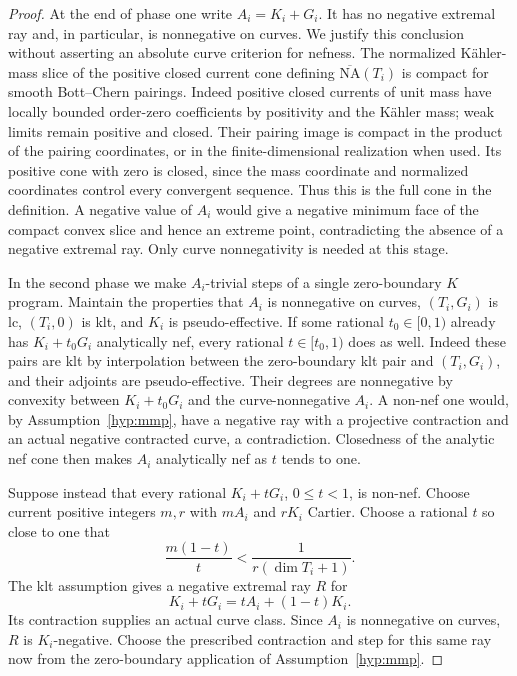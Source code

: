\documentclass[11pt,letterpaper]{article}
\theoremstyle{definition}
\theoremstyle{remark}
\begin{document}
\begin{proof}
At the end of phase one write $A_i=K_i+G_i$.  It has no negative
extremal ray and, in particular, is nonnegative on curves.  We
justify this conclusion without asserting an absolute curve
criterion for nefness.  The normalized K\"ahler-mass slice of the
positive closed current cone defining
$\overline{\mathrm{NA}}(T_i)$ is compact for smooth Bott--Chern pairings.
Indeed positive closed currents of unit mass have locally bounded
order-zero coefficients by positivity and the K\"ahler mass; weak
limits remain positive and closed.  Their pairing image is compact
in the product of the pairing coordinates, or in the
finite-dimensional realization when used.  Its positive cone with
zero is closed, since the mass coordinate and normalized
coordinates control every convergent sequence.  Thus this is the
full cone in the definition.  A negative value of $A_i$ would give
a negative minimum face of the compact convex slice and hence an
extreme point, contradicting the absence of a negative extremal
ray.  Only curve nonnegativity is needed at this stage.

In the second phase we make $A_i$-trivial steps of a single
zero-boundary $K$ program.  Maintain the properties that $A_i$ is
nonnegative on curves, $(T_i,G_i)$ is lc, $(T_i,0)$ is klt, and
$K_i$ is pseudo-effective.  If some rational $t_0\in[0,1)$ already
has $K_i+t_0G_i$ analytically nef, every rational $t\in[t_0,1)$
does as well.  Indeed these pairs are klt by interpolation between
the zero-boundary klt pair and $(T_i,G_i)$, and their adjoints are
pseudo-effective.  Their degrees are nonnegative by convexity
between $K_i+t_0G_i$ and the curve-nonnegative $A_i$.  A non-nef
one would, by Assumption~\ref{hyp:mmp}, have a negative ray with a
projective contraction and an actual negative contracted curve, a
contradiction.  Closedness of the analytic nef cone then makes
$A_i$ analytically nef as $t$ tends to one.

Suppose instead that every rational $K_i+tG_i$, $0\leq t<1$, is
non-nef.  Choose current positive integers $m,r$ with $mA_i$ and
$rK_i$ Cartier.  Choose a rational $t$ so close to one that
\begin{equation}
 \frac{m(1-t)}{t}<\frac{1}{r(\dim T_i+1)}.
 \label{bir:near-one-choice}
\end{equation}
The klt assumption gives a negative extremal ray $R$ for
\[
 K_i+tG_i=tA_i+(1-t)K_i.
\]
Its contraction supplies an actual curve class.  Since $A_i$ is
nonnegative on curves, $R$ is $K_i$-negative.  Choose the prescribed
contraction and step for this same ray now from the zero-boundary
application of Assumption~\ref{hyp:mmp}.


\end{proof}
\end{document}
